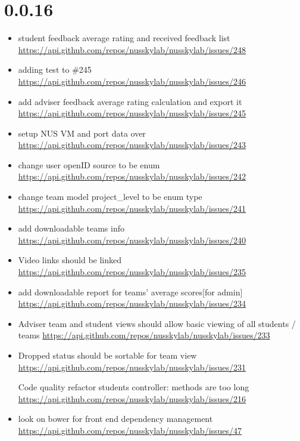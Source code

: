 {\section{0.0.16}
\begin{itemize}[noitemsep]
    \item student feedback average rating and received feedback list \url{https://api.github.com/repos/nusskylab/nusskylab/issues/248} 
    \item adding test to \#245 \url{https://api.github.com/repos/nusskylab/nusskylab/issues/246} 
    \item add adviser feedback average rating calculation and export it \url{https://api.github.com/repos/nusskylab/nusskylab/issues/245} 
    \item setup NUS VM and port data over \url{https://api.github.com/repos/nusskylab/nusskylab/issues/243} 
    \item change user openID source to be enum \url{https://api.github.com/repos/nusskylab/nusskylab/issues/242} 
    \item change team model project\_level to be enum type \url{https://api.github.com/repos/nusskylab/nusskylab/issues/241} 
    \item add downloadable teams info \url{https://api.github.com/repos/nusskylab/nusskylab/issues/240} 
    \item Video links should be linked \url{https://api.github.com/repos/nusskylab/nusskylab/issues/235} 
    \item add downloadable report for teams' average scores[for admin] \url{https://api.github.com/repos/nusskylab/nusskylab/issues/234} 
    \item Adviser team and student views should allow basic viewing of all students / teams \url{https://api.github.com/repos/nusskylab/nusskylab/issues/233} 
    \item Dropped status should be sortable for team view \url{https://api.github.com/repos/nusskylab/nusskylab/issues/231} 
    \item [Code quality]refactor students controller: methods are too long \url{https://api.github.com/repos/nusskylab/nusskylab/issues/216} 
    \item look on bower for front end dependency management \url{https://api.github.com/repos/nusskylab/nusskylab/issues/47} 
\end{itemize}

}
